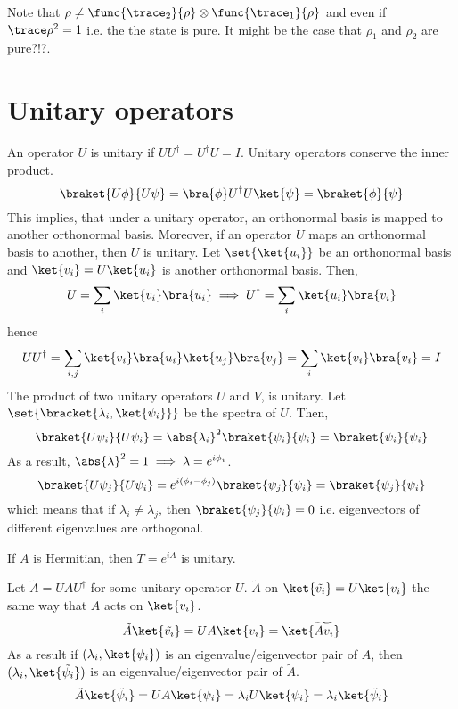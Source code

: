 Note that \(\rho \neq \func{\trace_2}{\rho} \otimes \func{\trace_1}{\rho}\) and even if \(\trace \rho^2 = 1\) i.e. the the state is pure. It might be the case that \(\rho_1\) and \(\rho_2\) are pure?!?.

\section{Unitary operators}
An operator \(U\) is unitary if \(UU^{\dagger} = U^{\dagger} U = I\). Unitary operators conserve the inner product.
\begin{equation*}
    \braket{U \phi}{U \psi} = \bra{\phi} U^{\dagger} U \ket{\psi} = \braket{\phi}{\psi}
\end{equation*}
This implies, that under a unitary operator, an orthonormal basis is mapped to another orthonormal basis. Moreover, if an operator \(U\) maps an orthonormal basis to another, then \(U\) is unitary. Let \(\set{\ket{u_i}}\) be an orthonormal basis and \(\ket{v_i} = U \ket{u_i}\) is another orthonormal basis. Then, 
\begin{equation*}
    U  = \sum_i \ket{v_i}\bra{u_i} \implies U^{\dagger} = \sum_i \ket{u_i} \bra{v_i}
\end{equation*}
hence 
\begin{equation*}
    U U^{\dagger} = \sum_{i,j} \ket{v_i}\bra{u_i}\ket{u_j} \bra{v_j} = \sum_i \ket{v_i}\bra{v_i} = I
\end{equation*}
The product of two unitary operators \(U\) and \(V\), is unitary. Let \(\set{\bracket{\lambda_i,\ket{\psi_i}}}\) be the spectra of \(U\). Then, 
\begin{equation*}
    \braket{U\psi_i}{U\psi_i} = \abs{\lambda_i}^2 \braket{\psi_i}{\psi_i}= \braket{\psi_i}{\psi_i}
\end{equation*}
As a result, \(\abs{\lambda}^2 = 1 \implies \lambda = e^{i \phi_i}\). 
\begin{equation*}
    \braket{U\psi_j}{U\psi_i} = e^{i (\phi_i - \phi_j)} \braket{\psi_j}{\psi_i}= \braket{\psi_j}{\psi_i}
\end{equation*}
which means that if \(\lambda_i \neq \lambda_j\), then \(\braket{\psi_j}{\psi_i} = 0\) i.e. eigenvectors of different eigenvalues are orthogonal.

\begin{proposition}
    If \(A\) is Hermitian, then \(T = e^{iA}\) is unitary.
\end{proposition}

Let \(\tilde{A} = U A U^{\dagger}\) for some unitary operator \(U\). \(\tilde{A}\) on \(\ket{\tilde{v_i}} = U \ket{v_i}\) the same way that \(A\) acts on \(\ket{v_i}\). 
\begin{equation*}
    \tilde{A} \ket{\tilde{v_i}}  = U A \ket{v_i} = \ket{\widetilde{Av_i}}
\end{equation*}
As a result if \((\lambda_i, \ket{\psi_i})\) is an eigenvalue/eigenvector pair of \(A\), then \((\lambda_i, \ket{\tilde{\psi_i}})\) is an eigenvalue/eigenvector pair of \(\tilde{A}\).
\begin{equation*}
    \tilde{A} \ket{\tilde{\psi_i}}  = U A \ket{\psi_i} = \lambda_i U \ket{\psi_i} = \lambda_i \ket{\tilde{\psi_i}}
\end{equation*}

